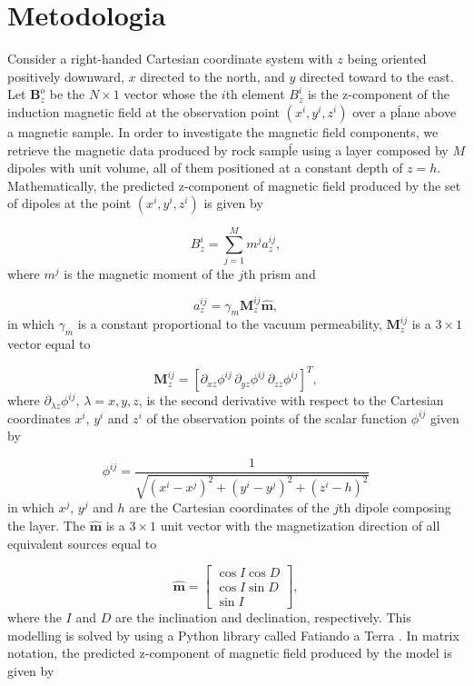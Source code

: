 \chapter{Metodologia}

Consider a right-handed Cartesian coordinate system with $z$ being oriented positively downward, $x$ directed to the north, and $y$ directed toward to the east. Let $\mathbf{B}_z^o$ be the $N \times 1$ vector whose the $i$th element $B_z^i$ is the z-component of the induction magnetic field at the observation point $(x^i,y^i,z^i)$ over a pĺane above a magnetic sample. In order to investigate the magnetic field components, we retrieve the magnetic data produced by rock sampĺe using a layer composed by $M$ dipoles with unit volume, all of them positioned at a constant depth of $z=h$. Mathematically, the predicted z-component of magnetic field produced by the set of dipoles at the point $(x^i,y^i,z^i)$ is given by

\begin{equation}
B_{z}^{i}  = \sum_{j=1}^{M} m^j a_z^{ij},
\label{eq:pred_data_ith}
\end{equation}
where $m^j$ is the magnetic moment of the $j$th prism and 

\begin{equation}
a_{z}^{ij}  = \gamma_m \mathbf{M}_z^{ij} \hat{\mathbf{m}},
\label{eq:az_ij}
\end{equation}
in which $\gamma_m$ is a constant proportional to the vacuum permeability, $\mathbf{M}_z^{ij}$ is a $3 \times 1$ vector equal to 

\begin{equation}
\mathbf{M}_z^{ij}  =  [\partial_{xz} \phi^{ij} \, \partial_{yz} \phi^{ij} \, \partial_{zz} \phi^{ij}]^T,
\label{eq:Mz_ij}
\end{equation}
where $\partial_{\lambda z} \phi^{ij}$, $\lambda=x,y,z$, is the second derivative with respect to the Cartesian coordinates $x^i$, $y^i$ and $z^i$ of the observation points of the scalar function $\phi^{ij}$ given by

\begin{equation}
\phi^{ij} = \dfrac{1}{\sqrt{(x^i - x^j)^2 + (y^i- y^j )^2 + (z^i - h)^2 } }
\label{eq:phi_ij}
\end{equation}
in which $x^j$, $y^j$ and $h$ are the Cartesian coordinates of the $j$th dipole composing the layer. The $\hat{\mathbf{m}}$ is a $3 \times 1$ unit vector with the magnetization direction of all equivalent sources equal to

\begin{equation}
\hat{\mathbf{m}} =
\left[ \begin{array}{c}
\cos I \cos D \\
\cos I \sin D \\
\sin I     
\end{array} \right] ,
\label{eq:main_field}
\end{equation}
where the $I$ and $D$ are the inclination and declination, respectively. This modelling is solved by using a Python library called Fatiando a Terra \citep{uieda2013}. In matrix notation, the predicted z-component of magnetic field produced by the model is given by

